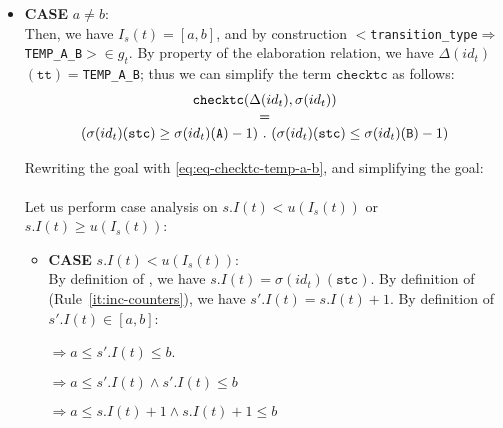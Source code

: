 \documentclass[dvipsnames,12pt]{article}
\begin{document}
\begin{niproof}
\begin{enumerate}
\begin{enumerate}
\begin{enumerate}
\begin{itemize}
\begin{itemize}
          \item \textbf{CASE} $a\neq{}b$: \\
            Then, we have $I_s(t)=[a,b]$, and by construction
            ${<}$\texttt{transition\_type}$\Rightarrow{}$
            \texttt{TEMP\_A\_B}${>}\in{}g_t$. By property of the
            elaboration relation, we have
            $\Delta(id_t)$$(\texttt{tt})=$\texttt{TEMP\_A\_B}; thus we can
            simplify the term $\mathtt{checktc}$ as follows:
            \begin{equation}
              \label{eq:eq-checktc-temp-a-b}
              \begin{array}{c}
                \multicolumn{1}{c}{\mathtt{checktc}(\Delta(id_t),\sigma(id_t))}\\
                \multicolumn{1}{c}{=}\\
                (\sigma(id_t)(\texttt{stc})\ge{}\sigma(id_t)(\texttt{A})-1)~.~(\sigma(id_t)(\texttt{stc})\le{}\sigma(id_t)(\texttt{B})-1)\\
              \end{array}\\
            \end{equation}

            Rewriting the goal with \eqref{eq:eq-checktc-temp-a-b},
            and simplifying the goal:\\
            \\
            
            Let us perform case analysis on $s.I(t)<u(I_s(t))$ or
            $s.I(t)\ge{}u(I_s(t))$:
            \begin{itemize}
            \item \textbf{CASE} $s.I(t)<u(I_s(t))$:\\
              By definition of \upSim, we have
              $s.I(t)=\sigma(id_t)(\texttt{stc})$. By definition of \dwSitpn
              (Rule~\ref{it:inc-counters}), we have
              $s'.I(t)=s.I(t)+1$. By definition of $s'.I(t)\in[a,b]$:
              
              $\Rightarrow{}a\le{}s'.I(t)\le{}b$.
              
              $\Rightarrow{}a\le{}s'.I(t)\land{}s'.I(t)\le{}b$

              $\Rightarrow{}a\le{}s.I(t)+1\land{}s.I(t)+1\le{}b$


\end{itemize}
\end{itemize}
\end{itemize}
\end{enumerate}
\end{enumerate}
\end{enumerate}
\end{niproof}
\end{document}
